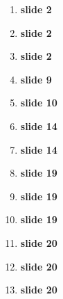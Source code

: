 \documentclass[11pt]{article}
\begin{document}
\begin{enumerate}
  \item \textbf{slide 2} \cite{suzukiAtelier,Kim2017,Nebeling:2016:WCW:2858036.2858169} 
  \item \textbf{slide 2} \cite{Chang:2016:ACC:2858036.2858411}
  \item \textbf{slide 2} \cite{turkopticon,dynamo,takingAHITMcInnis}
  \item \textbf{slide 9} \cite{crowdForgeKittur}
  \item \textbf{slide 10} 
  \item \textbf{slide 14} \cite{embracingErrorKrishna}
  \item \textbf{slide 14} \cite{taskSearch,delayAndOrderLasecki}
  \item \textbf{slide 19} \cite{whyWouldAnyoneBrewer}
  \item \textbf{slide 19} \cite{MaliciousCrowdworkersGadiraju}
  \item \textbf{slide 19} \cite{turkopticon}
  \item \textbf{slide 20} \cite{clark1908cotton}
  \item \textbf{slide 20} \cite{roy1954efficiency}
  \item \textbf{slide 20} \cite{hart2016rise}
\end{enumerate}


\printbibliography{}
\end{document}
